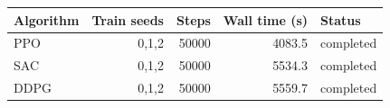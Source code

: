 \begin{tabular}{lrrrl}
\toprule
Algorithm & Train seeds & Steps & Wall time (s) & Status \\
\midrule
PPO & 0,1,2 & 50000 & 4083.5 & completed \\
SAC & 0,1,2 & 50000 & 5534.3 & completed \\
DDPG & 0,1,2 & 50000 & 5559.7 & completed \\
\bottomrule
\end{tabular}
